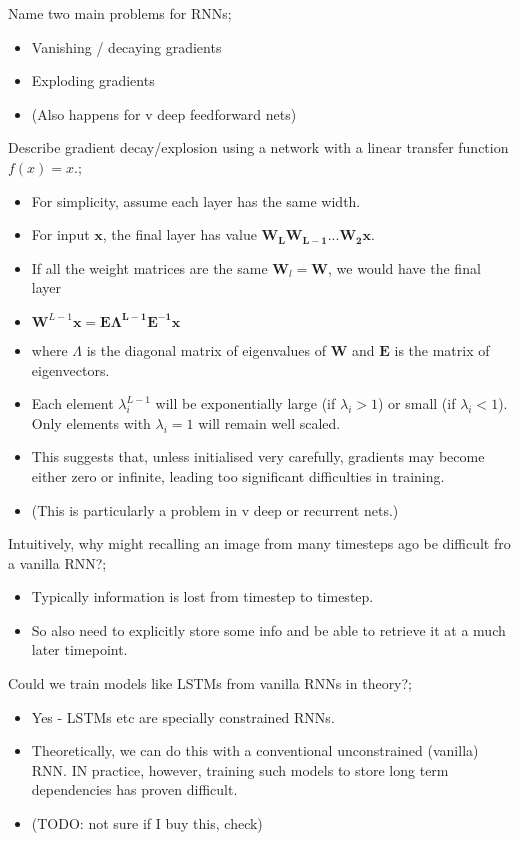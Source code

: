 \documentclass{article}
\begin{document}
Name two main problems for RNNs; \begin{itemize} \item Vanishing / decaying gradients \item Exploding gradients \item (Also happens for v deep feedforward nets) \end{itemize}

Describe gradient decay/explosion using a network with a linear transfer function $f(x) = x$.; \begin{itemize} \item For simplicity, assume each layer has the same width. \item For input $\bm{x}$, the final layer has value $\bm{W_LW_{L-1}...W_2x}$. \item If all the weight matrices are the same $\bm{W}_l = \bm{W}$, we would have the final layer \item $\bm{W}^{L-1}\bm{x = E\Lambda^{L-1}E^{-1}x}$ \item where $\Lambda$ is the diagonal matrix of eigenvalues of $\bm{W}$ and $\bm{E}$ is the matrix of eigenvectors. \item Each element $\lambda_i^{L-1}$ will be exponentially large (if $\lambda_i > 1$) or small (if $\lambda_i < 1$). Only elements with $\lambda_i = 1$ will remain well scaled. \item This suggests that, unless initialised very carefully, gradients may become either zero or infinite, leading too significant difficulties in training. \item (This is particularly a problem in v deep or recurrent nets.) \end{itemize}

Intuitively, why might recalling an image from many timesteps ago be difficult fro a vanilla RNN?; \begin{itemize} \item Typically information is lost from timestep to timestep. \item So also need to explicitly store some info and be able to retrieve it at a much later timepoint. \end{itemize}

Could we train models like LSTMs from vanilla RNNs in theory?; \begin{itemize} \item Yes - LSTMs etc are specially constrained RNNs.  \item Theoretically, we can do this with a conventional unconstrained (vanilla) RNN. IN practice, however, training such models to store long term dependencies has proven difficult. \item (TODO: not sure if I buy this, check) \end{itemize}
\end{document}
